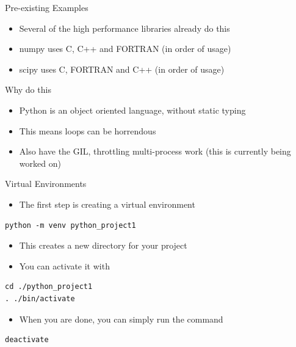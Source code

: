 \documentclass[presentation]{beamer}
\begin{document}
\begin{frame}[label=pre-existing-examples]{Pre-existing Examples}
\begin{itemize}
\item Several of the high performance libraries already do this
\item numpy uses C, C++ and FORTRAN (in order of usage)
\item scipy uses C, FORTRAN and C++ (in order of usage)
\end{itemize}
\end{frame}
\begin{frame}[label=why-do-this]{Why do this}
\begin{itemize}
\item Python is an object oriented language, without static typing
\item This means loops can be horrendous
\item Also have the GIL, throttling multi-process work (this is currently being worked on)
\end{itemize}
\end{frame}
\begin{frame}[label=virtual-environments,fragile]{Virtual Environments}
 \begin{itemize}
\item The first step is creating a virtual environment
\end{itemize}

\begin{verbatim}
python -m venv python_project1
\end{verbatim}

\begin{itemize}
\item This creates a new directory for your project
\item You can activate it with
\end{itemize}

\begin{verbatim}
cd ./python_project1
. ./bin/activate
\end{verbatim}

\begin{itemize}
\item When you are done, you can simply run the command
\end{itemize}

\begin{verbatim}
deactivate
\end{verbatim}
\end{frame}
\end{document}
